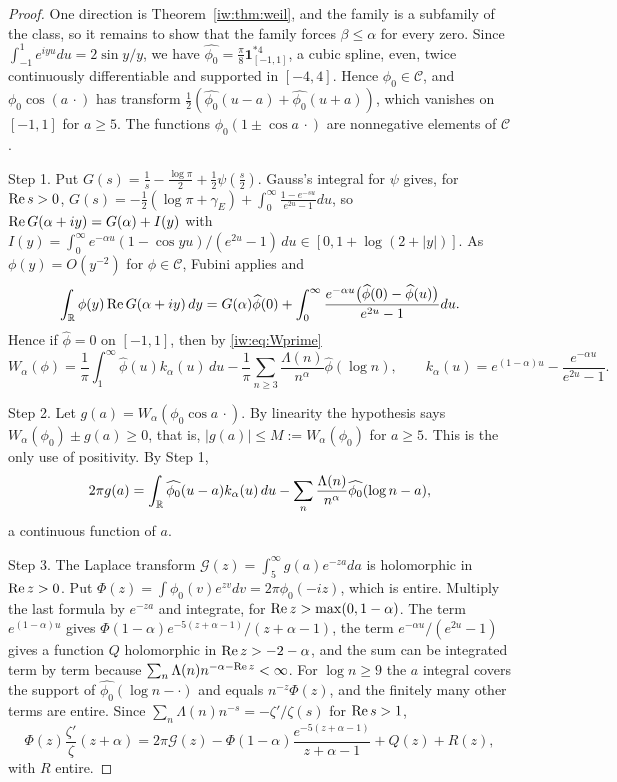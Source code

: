 \begin{proof}
One direction is Theorem~\ref{iw:thm:weil}, and the family is a subfamily of the class, so it remains to show that the family forces $\beta\le\alpha$ for every zero. Since $\int_{-1}^1e^{iyu}du=2\sin y/y$, we have $\widehat{\phi_0}=\frac\pi8\mathbf 1_{[-1,1]}^{*4}$, a cubic spline, even, twice continuously differentiable and supported in $[-4,4]$. Hence $\phi_0\in\mathcal C$, and $\phi_0\cos(a\,\cdot)$ has transform $\frac12(\widehat{\phi_0}(u-a)+\widehat{\phi_0}(u+a))$, which vanishes on $[-1,1]$ for $a\ge5$. The functions $\phi_0(1\pm\cos a\,\cdot)$ are nonnegative elements of $\mathcal C$.

Step 1. Put $G(s)=\frac1s-\frac{\log\pi}2+\frac12\psi(\frac s2)$. Gauss's integral for $\psi$ gives, for $\operatorname{Re} s>0$, $G(s)=-\frac12(\log\pi+\gamma_E)+\int_0^\infty\frac{1-e^{-su}}{e^{2u}-1}du$, so $\operatorname{Re} G(\alpha+iy)=G(\alpha)+I(y)$ with $I(y)=\int_0^\infty e^{-\alpha u}(1-\cos yu)/(e^{2u}-1)\,du\in[0,1+\log(2+|y|)]$. As $\phi(y)=O(y^{-2})$ for $\phi\in\mathcal C$, Fubini applies and
\[
\int_{\mathbb{R}}\phi(y)\operatorname{Re} G(\alpha+iy)\,dy=G(\alpha)\widehat\phi(0)+\int_0^\infty\frac{e^{-\alpha u}\big(\widehat\phi(0)-\widehat\phi(u)\big)}{e^{2u}-1}du .
\]
Hence if $\widehat\phi=0$ on $[-1,1]$, then by \eqref{iw:eq:Wprime}
\[
W_\alpha(\phi)=\frac1\pi\int_1^\infty\widehat\phi(u)k_\alpha(u)\,du-\frac1\pi\sum_{n\ge3}\frac{\Lambda(n)}{n^\alpha}\widehat\phi(\log n),\qquad k_\alpha(u)=e^{(1-\alpha)u}-\frac{e^{-\alpha u}}{e^{2u}-1}.
\]

Step 2. Let $g(a)=W_\alpha(\phi_0\cos a\,\cdot)$. By linearity the hypothesis says $W_\alpha(\phi_0)\pm g(a)\ge0$, that is, $|g(a)|\le M:=W_\alpha(\phi_0)$ for $a\ge5$. This is the only use of positivity. By Step 1,
\[
2\pi g(a)=\int_{\mathbb{R}}\widehat{\phi_0}(u-a)k_\alpha(u)\,du-\sum_n\frac{\Lambda(n)}{n^\alpha}\widehat{\phi_0}(\log n-a),
\]
a continuous function of $a$.

Step 3. The Laplace transform $\mathcal G(z)=\int_5^\infty g(a)e^{-za}da$ is holomorphic in $\operatorname{Re} z>0$. Put $\Phi(z)=\int\widehat{\phi_0}(v)e^{zv}dv=2\pi\phi_0(-iz)$, which is entire. Multiply the last formula by $e^{-za}$ and integrate, for $\operatorname{Re} z>\max(0,1-\alpha)$. The term $e^{(1-\alpha)u}$ gives $\Phi(1-\alpha)e^{-5(z+\alpha-1)}/(z+\alpha-1)$, the term $e^{-\alpha u}/(e^{2u}-1)$ gives a function $Q$ holomorphic in $\operatorname{Re} z>-2-\alpha$, and the sum can be integrated term by term because $\sum_n\Lambda(n)n^{-\alpha-\operatorname{Re} z}<\infty$. For $\log n\ge9$ the $a$ integral covers the support of $\widehat{\phi_0}(\log n-\cdot)$ and equals $n^{-z}\Phi(z)$, and the finitely many other terms are entire. Since $\sum_n\Lambda(n)n^{-s}=-\zeta'/\zeta(s)$ for $\operatorname{Re} s>1$,
\[
\Phi(z)\frac{\zeta'}\zeta(z+\alpha)=2\pi\mathcal G(z)-\Phi(1-\alpha)\frac{e^{-5(z+\alpha-1)}}{z+\alpha-1}+Q(z)+R(z),
\]
with $R$ entire.


\end{proof}
